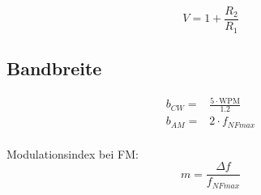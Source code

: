 \documentclass[10pt,landscape]{scrartcl}
\begin{document}
\begin{multicols}{3}
$$ V = 1 + \frac{R_{2}}{R_{1}} $$

\subsection*{Bandbreite}

\begin{align*}
b_{CW} =& \frac{5\cdot \text{WPM}}{1.2} \\
b_{AM} =& 2 \cdot f_{NFmax} \\
\end{align*}

Modulationsindex bei FM:
$$m = \frac{\Delta f}{f_{NFmax}} $$ 


\end{multicols}
\end{document}
